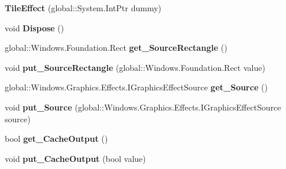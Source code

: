 \begin{DoxyCompactItemize}
{\bfseries Tile\+Effect} (global\+::\+System.\+Int\+Ptr dummy)
\item 
\mbox{\label{class_microsoft_1_1_graphics_1_1_canvas_1_1_effects_1_1_tile_effect_a82911fbdb206a47dd070948da25b15b2}} 
void {\bfseries Dispose} ()
\item 
\mbox{\label{class_microsoft_1_1_graphics_1_1_canvas_1_1_effects_1_1_tile_effect_ab1844baf6fd7b1291017af32256cb757}} 
global\+::\+Windows.\+Foundation.\+Rect {\bfseries get\+\_\+\+Source\+Rectangle} ()
\item 
\mbox{\label{class_microsoft_1_1_graphics_1_1_canvas_1_1_effects_1_1_tile_effect_a1a2a8a43669447290f1788aeafe2a795}} 
void {\bfseries put\+\_\+\+Source\+Rectangle} (global\+::\+Windows.\+Foundation.\+Rect value)
\item 
\mbox{\label{class_microsoft_1_1_graphics_1_1_canvas_1_1_effects_1_1_tile_effect_a7915c13a5ebe9c3c5289e7a8098f8c6a}} 
global\+::\+Windows.\+Graphics.\+Effects.\+I\+Graphics\+Effect\+Source {\bfseries get\+\_\+\+Source} ()
\item 
\mbox{\label{class_microsoft_1_1_graphics_1_1_canvas_1_1_effects_1_1_tile_effect_aba6942fe8fd59d19eb6ae826d403ca0a}} 
void {\bfseries put\+\_\+\+Source} (global\+::\+Windows.\+Graphics.\+Effects.\+I\+Graphics\+Effect\+Source source)
\item 
\mbox{\label{class_microsoft_1_1_graphics_1_1_canvas_1_1_effects_1_1_tile_effect_a34471e14ce7781b362ff9a33095823d1}} 
bool {\bfseries get\+\_\+\+Cache\+Output} ()
\item 
\mbox{\label{class_microsoft_1_1_graphics_1_1_canvas_1_1_effects_1_1_tile_effect_a0939a2d0898392b5bdc2e982fbeb6bb1}} 
void {\bfseries put\+\_\+\+Cache\+Output} (bool value)
\item 
\mbox{\label{class_microsoft_1_1_graphics_1_1_canvas_1_1_effects_1_1_tile_effect_aada4294bc238ad104a96e172d5ff1ab5}} 

\end{DoxyCompactItemize}
